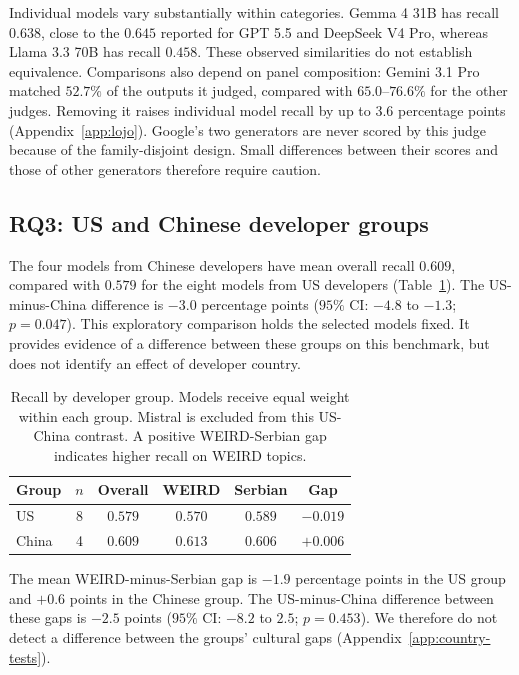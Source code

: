\documentclass[11pt,a4paper]{article}
\begin{document}
Individual models vary substantially within categories. Gemma 4 31B has recall $0.638$, close to the $0.645$ reported for GPT 5.5 and DeepSeek V4 Pro, whereas Llama 3.3 70B has recall $0.458$. These observed similarities do not establish equivalence. Comparisons also depend on panel composition: Gemini 3.1 Pro matched $52.7\%$ of the outputs it judged, compared with $65.0$--$76.6\%$ for the other judges. Removing it raises individual model recall by up to $3.6$ percentage points (Appendix~\ref{app:lojo}). Google's two generators are never scored by this judge because of the family-disjoint design. Small differences between their scores and those of other generators therefore require caution.

\subsection{RQ3: US and Chinese developer groups}
\label{sec:rq3}
The four models from Chinese developers have mean overall recall $0.609$, compared with $0.579$ for the eight models from US developers (Table~\ref{tab:origin-recall}). The US-minus-China difference is $-3.0$ percentage points ($95\%$ CI: $-4.8$ to $-1.3$; $p=0.047$). This exploratory comparison holds the selected models fixed. It provides evidence of a difference between these groups on this benchmark, but does not identify an effect of developer country.

\begin{table}[!htbp]
\centering
\small
\caption{Recall by developer group. Models receive equal weight within each group. Mistral is excluded from this US-China contrast. A positive WEIRD-Serbian gap indicates higher recall on WEIRD topics.}
\label{tab:origin-recall}
\setlength{\tabcolsep}{3pt}
\begin{tabular*}{\columnwidth}{@{\extracolsep{\fill}}lccccc@{}}
\toprule
Group & $n$ & Overall & WEIRD & Serbian & Gap\\
\midrule
US & 8 & $0.579$ & $0.570$ & $0.589$ & $-0.019$\\
China & 4 & $0.609$ & $0.613$ & $0.606$ & $+0.006$\\
\bottomrule
\end{tabular*}
\end{table}

The mean WEIRD-minus-Serbian gap is $-1.9$ percentage points in the US group and $+0.6$ points in the Chinese group. The US-minus-China difference between these gaps is $-2.5$ points ($95\%$ CI: $-8.2$ to $2.5$; $p=0.453$). We therefore do not detect a difference between the groups' cultural gaps (Appendix~\ref{app:country-tests}).
\end{document}
